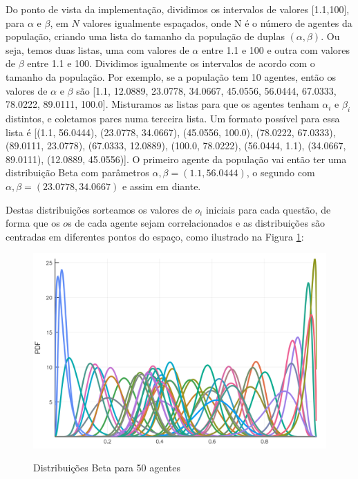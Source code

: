 Do ponto de vista da implementação, dividimos os intervalos de valores
[1.1,100], para \(\alpha\) e \(\beta\), em \(N\) valores igualmente espaçados, onde N é o
número de agentes da população, criando uma lista do tamanho da população de
duplas \((\alpha,\beta)\). Ou seja, temos duas listas, uma com valores de \(\alpha\) entre 1.1
e 100 e outra com valores de \(\beta\) entre 1.1 e 100. Dividimos igualmente os
intervalos de acordo com o tamanho da população. Por exemplo, se a população tem
10 agentes,  então os valores de \(\alpha\) e \(\beta\) são [1.1, 12.0889, 23.0778,
34.0667, 45.0556, 56.0444, 67.0333, 78.0222, 89.0111, 100.0]. Misturamos as
listas para que os agentes tenham \(\alpha_i\) e \(\beta_i\) distintos, e coletamos pares
numa terceira lista. Um formato possível para essa lista é [(1.1, 56.0444),
(23.0778, 34.0667), (45.0556, 100.0), (78.0222, 67.0333), (89.0111, 23.0778),
(67.0333, 12.0889), (100.0, 78.0222), (56.0444, 1.1), (34.0667, 89.0111),
(12.0889, 45.0556)]. O primeiro agente da população vai então ter uma
distribuição Beta com parâmetros \(\alpha, \beta = (1.1, 56.0444) \), o segundo com
\(\alpha,\beta=(23.0778,34.0667)\) e assim em diante.

Destas distribuições sorteamos os valores de \(o_i\) iniciais para cada questão,
de forma que os \(o\)s de cada agente sejam correlacionados e as distribuições
são centradas em diferentes pontos do espaço, como ilustrado na Figura
\ref{fig:betas100}:

\begin{figure}[H]
  \centering
\caption{Distribuições Beta para 50 agentes}
  \includegraphics[width=\textwidth]{ims/beta100.png}
  \label{fig:betas100}
\end{figure}


